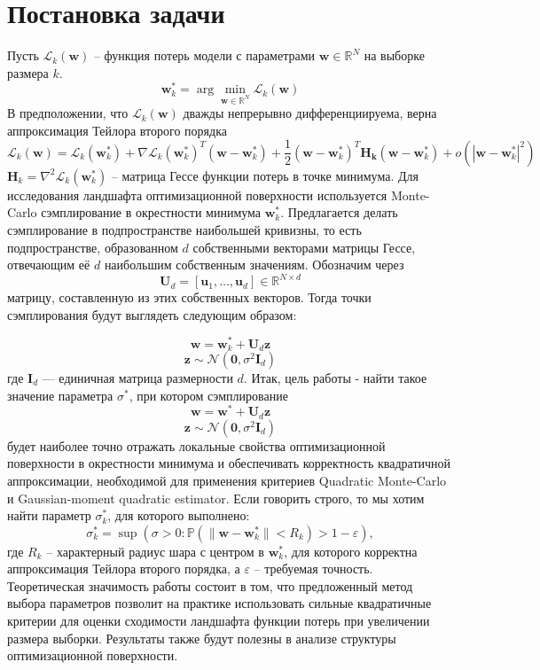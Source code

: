 \documentclass[11pt,a4paper]{article}
\begin{document}
\section{Постановка задачи}
Пусть $\mathcal{L}_k(\mathbf{w})$ -- функция потерь модели с параметрами $\mathbf{w} \in \mathbb{R}^N$ на выборке размера $k$. \newline
{}
$$\mathbf{w}_k^* = \arg\min_{\mathbf{w} \in \mathbb{R}^N} \mathcal{L}_k(\mathbf{w})$$
В предположении, что $\mathcal{L}_k(\mathbf{w})$ дважды непрерывно дифференциируема, верна аппроксимация Тейлора второго порядка
$$\mathcal{L}_k(\mathbf{w}) = \mathcal{L}_k(\mathbf{w}_k^*)+
\nabla\mathcal{L}_k(\mathbf{w}_k^*)^T(\mathbf{w}-\mathbf{w}_k^*)+
\frac{1}{2}(\mathbf{w}-\mathbf{w}_k^*)^T\mathbf{H_k}(\mathbf{w}-\mathbf{w}_k^*)+
o(|\mathbf{w} - \mathbf{w}_k^*|^2)$$
$\mathbf{H}_k = \nabla^2 \mathcal{L}_k(\mathbf{w}_k^*)$ -- матрица Гессе функции потерь в точке минимума.\newline
Для исследования ландшафта оптимизационной поверхности используется Monte-Carlo сэмплирование в окрестности минимума $\mathbf{w}_k^{*}$.\newline
Предлагается делать сэмплирование в подпространстве наибольшей кривизны, то есть подпространстве, образованном $d$ собственными векторами матрицы Гессе, отвечающим её $d$ наибольшим собственным значениям. Обозначим через
$$\mathbf{U}_d = [\mathbf{u}_1, \dots, \mathbf{u}_d] \in \mathbb{R}^{N \times d}$$
матрицу, составленную из этих собственных векторов. \newline
Тогда точки сэмплирования будут выглядеть следующим образом:

$$\mathbf{w} = \mathbf{w}_k^{*} + \mathbf{U}_d \mathbf{z}$$ 
$$\mathbf{z} \sim \mathcal{N}(\mathbf{0}, \sigma^2 \mathbf{I}_d)$$
где $\mathbf{I}_d$ --- единичная матрица размерности $d$. \newline
Итак, цель работы - найти такое значение параметра $\sigma^*$, при котором сэмплирование
$$\mathbf{w} = \mathbf{w}^{*} + \mathbf{U}_d \mathbf{z}$$ 
$$\mathbf{z} \sim \mathcal{N}(\mathbf{0}, \sigma^2 \mathbf{I}_d)$$
будет наиболее точно отражать локальные свойства оптимизационной поверхности в окрестности минимума и обеспечивать корректность квадратичной аппроксимации, необходимой для применения критериев Quadratic Monte-Carlo и Gaussian-moment quadratic estimator. \newline
Если говорить строго, то мы хотим найти параметр $\sigma^*_k$, для которого выполнено:
$$\sigma^*_k = \sup (\sigma > 0 :\mathbb{P}\!\left(\|\mathbf{w}-\mathbf{w}_k^*\| < R_k\right) > 1-\varepsilon),$$
где $R_k$ -- характерный радиус шара с центром в $\mathbf{w}_k^*$, для которого корректна аппроксимация Тейлора второго порядка, а $\varepsilon$ -- требуемая точность. \newline
Теоретическая значимость работы состоит в том, что предложенный метод выбора параметров позволит на практике использовать сильные квадратичные критерии для оценки сходимости ландшафта функции потерь при увеличении размера выборки. Результаты также будут полезны в анализе структуры оптимизационной поверхности.
\end{document}
